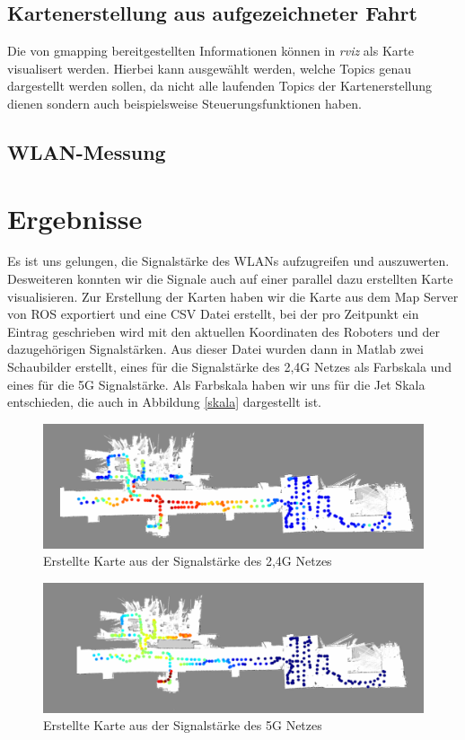 \documentclass{scrartcl}%
\begin{document}
\subsection{Kartenerstellung aus aufgezeichneter Fahrt}
Die von gmapping bereitgestellten Informationen können in \textit{rviz} als Karte visualisert werden. Hierbei kann ausgewählt werden, welche Topics genau dargestellt werden sollen, da nicht alle laufenden Topics der Kartenerstellung dienen sondern auch beispielsweise Steuerungsfunktionen haben.

\subsection{WLAN-Messung}

\newpage
\section{Ergebnisse}
Es ist uns gelungen, die Signalstärke des WLANs aufzugreifen und auszuwerten. Desweiteren konnten wir die Signale auch auf einer parallel dazu erstellten Karte visualisieren. Zur Erstellung der Karten haben wir die Karte aus dem Map Server von ROS exportiert und eine CSV Datei erstellt, bei der pro Zeitpunkt ein Eintrag geschrieben wird mit den aktuellen Koordinaten des Roboters und der dazugehörigen Signalstärken. Aus dieser Datei wurden dann in Matlab zwei Schaubilder erstellt, eines für die Signalstärke des 2,4G Netzes als Farbskala und eines für die 5G Signalstärke. Als Farbskala haben wir uns für die Jet Skala entschieden, die auch in Abbildung \ref{skala} dargestellt ist.

\begin{figure}[h!]
	\centering
	\includegraphics[width=\textwidth]{bilder/wlan-heatmap-2G4.png}
	\caption{Erstellte Karte aus der Signalstärke des 2,4G Netzes}
	\label{2g4}
\end{figure}

\begin{figure}[h!]
	\centering
	\includegraphics[width=\textwidth]{bilder/wlan-heatmap-5G.png}
	\caption{Erstellte Karte aus der Signalstärke des 5G Netzes}
	\label{5g}
\end{figure}
\end{document}
